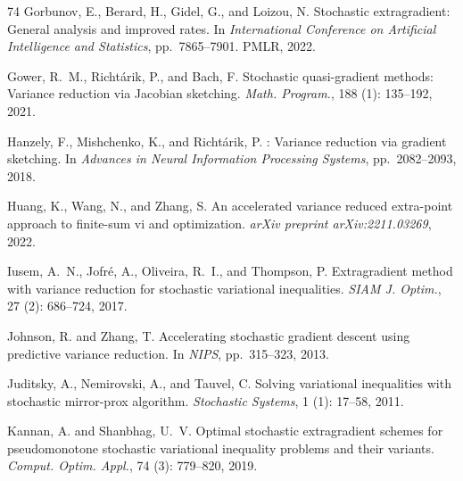 \documentclass{article}
\theoremstyle{plain}
\theoremstyle{definition}
\theoremstyle{remark}
\begin{document}
\begin{thebibliography}{74}
Gorbunov, E., Berard, H., Gidel, G., and Loizou, N.
\newblock Stochastic extragradient: General analysis and improved rates.
\newblock In \emph{International Conference on Artificial Intelligence and
  Statistics}, pp.\  7865--7901. PMLR, 2022.

Gower, R.~M., Richt{\'a}rik, P., and Bach, F.
\newblock Stochastic quasi-gradient methods: {V}ariance reduction via
  {J}acobian sketching.
\newblock \emph{Math. Program.}, 188 (1): 135--192, 2021.

Hanzely, F., Mishchenko, K., and Richt{\'a}rik, P.
: {V}ariance reduction via gradient sketching.
\newblock In \emph{Advances in Neural Information Processing Systems}, pp.\
  2082--2093, 2018.

Huang, K., Wang, N., and Zhang, S.
\newblock An accelerated variance reduced extra-point approach to finite-sum vi
  and optimization.
\newblock \emph{arXiv preprint arXiv:2211.03269}, 2022.

Iusem, A.~N., Jofr{\'e}, A., Oliveira, R.~I., and Thompson, P.
\newblock Extragradient method with variance reduction for stochastic
  variational inequalities.
\newblock \emph{SIAM J. Optim.}, 27 (2): 686--724, 2017.

Johnson, R. and Zhang, T.
\newblock Accelerating stochastic gradient descent using predictive variance
  reduction.
\newblock In \emph{NIPS}, pp.\  315--323, 2013.

Juditsky, A., Nemirovski, A., and Tauvel, C.
\newblock Solving variational inequalities with stochastic mirror-prox
  algorithm.
\newblock \emph{Stochastic Systems}, 1 (1): 17--58, 2011.

Kannan, A. and Shanbhag, U.~V.
\newblock Optimal stochastic extragradient schemes for pseudomonotone
  stochastic variational inequality problems and their variants.
\newblock \emph{Comput. Optim. Appl.}, 74 (3):\penalty0 779--820,
  2019.


\end{thebibliography}
\end{document}
